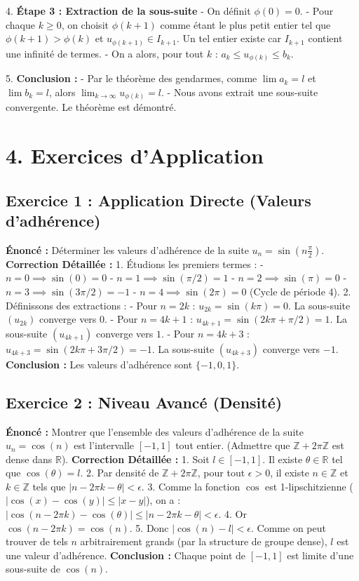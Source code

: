 \documentclass{report}
\begin{document}
4. \textbf{Étape 3 : Extraction de la sous-suite}
   - On définit $\phi(0) = 0$.
   - Pour chaque $k \ge 0$, on choisit $\phi(k+1)$ comme étant le plus petit entier tel que $\phi(k+1) > \phi(k)$ et $u_{\phi(k+1)} \in I_{k+1}$. Un tel entier existe car $I_{k+1}$ contient une infinité de termes.
   - On a alors, pour tout $k$ : $a_k \le u_{\phi(k)} \le b_k$.

5. \textbf{Conclusion :}
   - Par le théorème des gendarmes, comme $\lim a_k = l$ et $\lim b_k = l$, alors $\lim_{k \to \infty} u_{\phi(k)} = l$.
   - Nous avons extrait une sous-suite convergente. Le théorème est démontré.

\section*{4. Exercices d'Application}

\subsection*{Exercice 1 : Application Directe (Valeurs d'adhérence)}
\textbf{Énoncé :} Déterminer les valeurs d'adhérence de la suite $u_n = \sin(n \frac{\pi}{2})$.
\textbf{Correction Détaillée :}
1. Étudions les premiers termes :
   - $n=0 \implies \sin(0) = 0$
   - $n=1 \implies \sin(\pi/2) = 1$
   - $n=2 \implies \sin(\pi) = 0$
   - $n=3 \implies \sin(3\pi/2) = -1$
   - $n=4 \implies \sin(2\pi) = 0$ (Cycle de période 4).
2. Définissons des extractions :
   - Pour $n = 2k$ : $u_{2k} = \sin(k\pi) = 0$. La sous-suite $(u_{2k})$ converge vers $0$.
   - Pour $n = 4k+1$ : $u_{4k+1} = \sin(2k\pi + \pi/2) = 1$. La sous-suite $(u_{4k+1})$ converge vers $1$.
   - Pour $n = 4k+3$ : $u_{4k+3} = \sin(2k\pi + 3\pi/2) = -1$. La sous-suite $(u_{4k+3})$ converge vers $-1$.
\textbf{Conclusion :} Les valeurs d'adhérence sont $\{ -1, 0, 1 \}$.

\subsection*{Exercice 2 : Niveau Avancé (Densité)}
\textbf{Énoncé :} Montrer que l'ensemble des valeurs d'adhérence de la suite $u_n = \cos(n)$ est l'intervalle $[-1, 1]$ tout entier. (Admettre que $\mathbb{Z} + 2\pi\mathbb{Z}$ est dense dans $\mathbb{R}$).
\textbf{Correction Détaillée :}
1. Soit $l \in [-1, 1]$. Il existe $\theta \in \mathbb{R}$ tel que $\cos(\theta) = l$.
2. Par densité de $\mathbb{Z} + 2\pi\mathbb{Z}$, pour tout $\epsilon > 0$, il existe $n \in \mathbb{Z}$ et $k \in \mathbb{Z}$ tels que $|n - 2\pi k - \theta| < \epsilon$.
3. Comme la fonction $\cos$ est 1-lipschitzienne ($|\cos(x)-\cos(y)| \le |x-y|$), on a :
   $|\cos(n - 2\pi k) - \cos(\theta)| \le |n - 2\pi k - \theta| < \epsilon$.
4. Or $\cos(n - 2\pi k) = \cos(n)$.
5. Donc $|\cos(n) - l| < \epsilon$. Comme on peut trouver de tels $n$ arbitrairement grands (par la structure de groupe dense), $l$ est une valeur d'adhérence.
\textbf{Conclusion :} Chaque point de $[-1, 1]$ est limite d'une sous-suite de $\cos(n)$.
\end{document}
